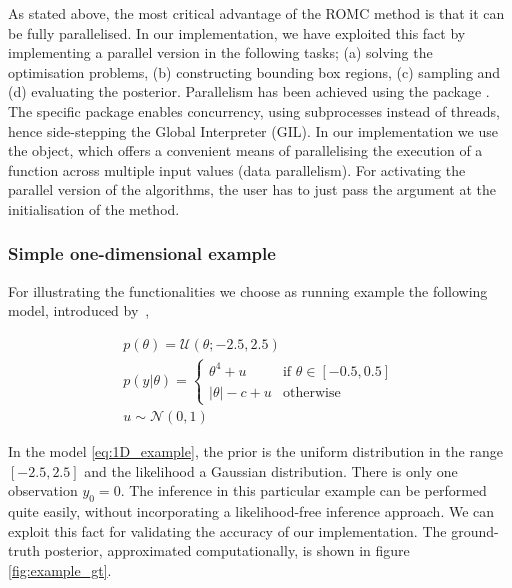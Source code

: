 As stated above, the most critical advantage of the ROMC method is that it can be fully parallelised. In our implementation, we have exploited this fact by implementing a parallel version in the following tasks; (a) solving the optimisation problems, (b) constructing bounding box regions, (c) sampling and (d) evaluating the posterior. Parallelism has been achieved using the package . The specific package enables concurrency, using subprocesses instead of threads, hence side-stepping the Global Interpreter (GIL). In our implementation we use the  object, which offers a convenient means of parallelising the execution of a function across multiple input values (data parallelism). For activating the parallel version of the algorithms, the user has to just pass the argument  at the initialisation of the  method.


\subsubsection*{Simple one-dimensional example}

For illustrating the functionalities we choose as running example the
following model, introduced by~\cite{Ikonomov2019},

\begin{gather} \label{eq:1D_example} p(\theta) =
\mathcal{U}(\theta;-2.5,2.5)\\ p(y|\theta) = \left\{
    \begin{array}{ll} \theta^4 + u & \mbox{if } \theta \in [-0.5, 0.5]
\\ |\theta| - c + u & \mbox{otherwise}
    \end{array} \right.\\ u \sim \mathcal{N}(0,1)
\end{gather}

\noindent

In the model \eqref{eq:1D_example}, the prior is the uniform
distribution in the range $[-2.5, 2.5]$ and the likelihood a Gaussian
distribution. There is only one observation $y_0 = 0$. The inference
in this particular example can be performed quite easily, without
incorporating a likelihood-free inference approach. We can exploit this
fact for validating the accuracy of our implementation. The
ground-truth posterior, approximated computationally, is shown in
figure \ref{fig:example_gt}.

